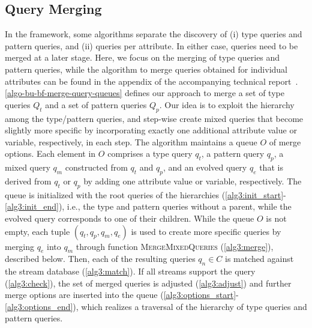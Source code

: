\subsection{Query Merging}
\label{sec:merging}
In the \sys{} framework, some algorithms separate the discovery of (i) type
queries and pattern queries, and (ii) queries per attribute. In either case,
queries need to be merged at a later stage. Here, we focus on the merging of
type queries and pattern queries, while the algorithm to merge queries
obtained for individual attributes can be found in the
appendix of the accompanying technical report~\cite{disces_TR}.
\autoref{algo-bu-bf-merge-query-queues} defines our approach to merge a set
of type queries $Q_t$ and a set of pattern queries $Q_p$.
Our idea is to exploit the hierarchy
among the type/pattern queries, and step-wise create mixed
queries that become slightly
more specific by incorporating exactly one additional attribute value or
variable, respectively, in each step.
The algorithm maintains a queue $O$ of merge options.
Each element in $O$ comprises a type query $q_t$, a pattern query $q_p$, a
mixed query $q_m$ constructed from $q_t$ and $q_p$, and an evolved query
$q_e$ that is derived from $q_t$ or $q_p$ by adding one attribute value or
variable, respectively. The queue is initialized with the root queries of
the hierarchies (\autoref{alg3:init_start}-\ref{alg3:init_end}), i.e., the
type and pattern queries without a parent, while the evolved query
corresponds to one of their children.
While the queue ${O}$ is not empty, each tuple $(\mathit{q_t}, \mathit{q_p},
\mathit{q_m}, \mathit{q_e})$ is used to create more
specific queries by merging $\mathit{q_e}$ into $\mathit{q_m}$ through
function \textsc{MergeMixedQueries} (\autoref{alg3:merge}), described below.
Then, each of the resulting queries ${q_n}\in C$ is matched against the
stream database (\autoref{alg3:match}). If all streams support the query
(\autoref{alg3:check}), the set of merged queries is adjusted
(\autoref{alg3:adjust}) and
further merge options are inserted into the queue
(\autoref{alg3:options_start}-\ref{alg3:options_end}), which realizes a
traversal of the hierarchy of type queries and pattern queries.
